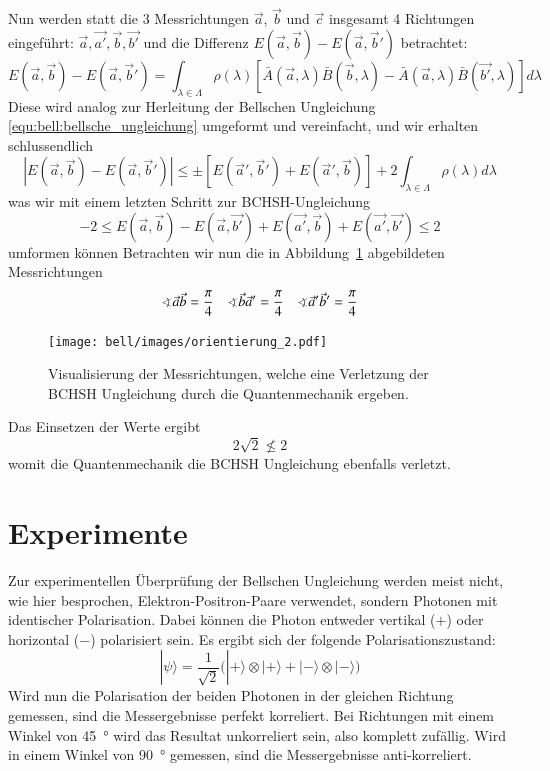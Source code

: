\begin{refsection}
Nun werden statt die 3 Messrichtungen $\vec{a}$, $\vec{b}$ und $\vec{c}$
insgesamt 4 Richtungen eingef\"uhrt: $\vec{a}, \vec{a'}, \vec{b}, \vec{b'}$
und die Differenz $E(\vec{a},\vec{b}) - E(\vec{a},\vec{b}')$ betrachtet:
\begin{equation}
    E(\vec{a},\vec{b}) - E(\vec{a},\vec{b}') = 
    \int_{\lambda\in\Lambda} \rho(\lambda) \left[
        \bar{A}(\vec{a},\lambda)\bar{B}(\vec{b},\lambda) -
        \bar{A}(\vec{a},\lambda)\bar{B}(\vec{b'},\lambda)
    \right] d\lambda
\end{equation}
Diese wird analog zur Herleitung der Bellschen Ungleichung 
\eqref{equ:bell:bellsche_ungleichung} umgeformt und vereinfacht, und wir
erhalten schlussendlich
\[
    \left| E(\vec{a},\vec{b}) - E(\vec{a},\vec{b}') \right| \leq \pm \left[
        E(\vec{a}',\vec{b}') + E(\vec{a}',\vec{b})
    \right]
    + 2 \int_{\lambda\in\Lambda} \rho(\lambda) d\lambda
\]
was wir mit einem letzten Schritt zur BCHSH-Ungleichung
\begin{equation}\label{equ:bell:bchsh-ungleichung}
    -2 \leq 
    E(\vec{a},\vec{b}) - E(\vec{a},\vec{b'}) + E(\vec{a'},\vec{b}) + E(\vec{a'},\vec{b'})
    \leq 2
\end{equation}
umformen k\"onnen
Betrachten wir nun die in Abbildung~\ref{fig:bell:orientierung_2}
abgebildeten Messrichtungen
\begin{align*}
    \varangle\vec{a}\vec{b} = \frac{\pi}{4} && 
    \varangle\vec{b}\vec{a}' = \frac{\pi}{4} && 
    \varangle\vec{a}'\vec{b}' = \frac{\pi}{4} 
\end{align*}
\begin{figure}
    \centering
    \texttt{[image: bell/images/orientierung\_2.pdf]}
    \caption{Visualisierung der Messrichtungen, welche eine Verletzung der
    BCHSH Ungleichung durch die Quantenmechanik ergeben.}
    \label{fig:bell:orientierung_2}
\end{figure}
Das Einsetzen der Werte ergibt
\[
    2 \sqrt{2} \nleqslant 2
\]
womit die Quantenmechanik die BCHSH Ungleichung ebenfalls verletzt.

\section{Experimente}
Zur experimentellen \"Uberpr\"ufung der Bellschen Ungleichung werden meist
nicht, wie hier besprochen, Elektron-Positron-Paare verwendet, sondern
Photonen mit identischer Polarisation.
Dabei k\"onnen die Photon entweder vertikal ($+$) oder horizontal
($-$) polarisiert sein. 
Es ergibt sich der folgende Polarisationszustand:
\begin{equation}\label{equ:bell:photonstate}
    |\psi\rangle = \frac{1}{\sqrt{2}} \Big(
        |{+}\rangle \otimes |{+}\rangle + |{-}\rangle \otimes |{-}\rangle
    \Big)
\end{equation}
Wird nun die Polarisation der beiden Photonen in der gleichen Richtung 
gemessen, sind die Messergebnisse perfekt korreliert.
Bei Richtungen mit einem Winkel von \SI{45}{\degree} wird das Resultat
unkorreliert sein, also komplett zuf\"allig.
Wird in einem Winkel von \SI{90}{\degree} gemessen, sind die Messergebnisse
anti-korreliert.


\end{refsection}
